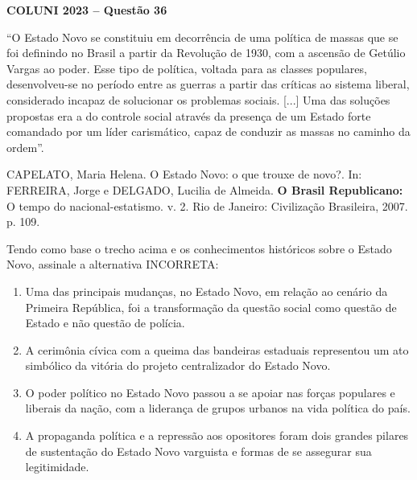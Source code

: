 \textbf{COLUNI 2023 -- Questão 36}\par\medskip “O Estado Novo se constituiu em decorrência de uma política de massas que se foi definindo no Brasil a partir da Revolução de 1930, com a ascensão de Getúlio Vargas ao poder. Esse tipo de política, voltada para as classes populares, desenvolveu-se no período entre as guerras a partir das críticas ao sistema liberal, considerado incapaz de solucionar os problemas sociais. [...] Uma das soluções propostas era a do controle social através da presença de um Estado forte comandado por um líder carismático, capaz de conduzir as massas no caminho da ordem”.

\par

CAPELATO, Maria Helena. O Estado Novo: o que trouxe de novo?. In: FERREIRA, Jorge e DELGADO, Lucilia de Almeida. \textbf{O Brasil Republicano:} O tempo do nacional-estatismo. v. 2. Rio de Janeiro: Civilização Brasileira, 2007. p. 109.

\par

Tendo como base o trecho acima e os conhecimentos históricos sobre o Estado Novo, assinale a alternativa INCORRETA:\begin{enumerate}
\item Uma das principais mudanças, no Estado Novo, em relação ao cenário da Primeira República, foi a
      transformação da questão social como questão de Estado e não questão de polícia.
\item A cerimônia cívica com a queima das bandeiras estaduais representou um ato simbólico da vitória do
      projeto centralizador do Estado Novo.
\item O poder político no Estado Novo passou a se apoiar nas forças populares e liberais da nação, com a
      liderança de grupos urbanos na vida política do país.
\item A propaganda política e a repressão aos opositores foram dois grandes pilares de sustentação do Estado
      Novo varguista e formas de se assegurar sua legitimidade.\end{enumerate}
